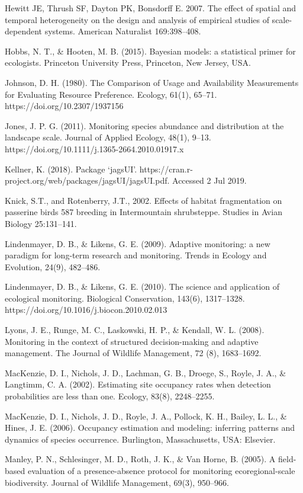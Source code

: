 \documentclass[
  letterpaper,
  DIV=11,
  numbers=noendperiod,
  oneside]{scrreprt}
\begin{document}
Hewitt JE, Thrush SF, Dayton PK, Bonsdorff E. 2007. The effect of
spatial and temporal heterogeneity on the design and analysis of
empirical studies of scale-dependent systems. American Naturalist
169:398--408.

Hobbs, N. T., \& Hooten, M. B. (2015). Bayesian models: a statistical
primer for ecologists. Princeton University Press, Princeton, New
Jersey, USA.

Johnson, D. H. (1980). The Comparison of Usage and Availability
Measurements for Evaluating Resource Preference. Ecology, 61(1), 65--71.
https://doi.org/10.2307/1937156

Jones, J. P. G. (2011). Monitoring species abundance and distribution at
the landscape scale. Journal of Applied Ecology, 48(1), 9--13.
https://doi.org/10.1111/j.1365-2664.2010.01917.x

Kellner, K. (2018). Package `jagsUI'.
https://cran.r-project.org/web/packages/jagsUI/jagsUI.pdf. Accessed 2
Jul 2019.

Knick, S.T., and Rotenberry, J.T., 2002. Effects of habitat
fragmentation on passerine birds 587 breeding in Intermountain
shrubsteppe. Studies in Avian Biology 25:131--141.

Lindenmayer, D. B., \& Likens, G. E. (2009). Adaptive monitoring: a new
paradigm for long-term research and monitoring. Trends in Ecology and
Evolution, 24(9), 482--486.

Lindenmayer, D. B., \& Likens, G. E. (2010). The science and application
of ecological monitoring. Biological Conservation, 143(6), 1317--1328.
https://doi.org/10.1016/j.biocon.2010.02.013

Lyons, J. E., Runge, M. C., Laskowski, H. P., \& Kendall, W. L. (2008).
Monitoring in the context of structured decision-making and adaptive
management. The Journal of Wildlife Management, 72 (8), 1683--1692.

MacKenzie, D. I., Nichols, J. D., Lachman, G. B., Droege, S., Royle, J.
A., \& Langtimm, C. A. (2002). Estimating site occupancy rates when
detection probabilities are less than one. Ecology, 83(8), 2248--2255.

MacKenzie, D. I., Nichols, J. D., Royle, J. A., Pollock, K. H., Bailey,
L. L., \& Hines, J. E. (2006). Occupancy estimation and modeling:
inferring patterns and dynamics of species occurrence. Burlington,
Massachusetts, USA: Elsevier.

Manley, P. N., Schlesinger, M. D., Roth, J. K., \& Van Horne, B. (2005).
A field-based evaluation of a presence-absence protocol for monitoring
ecoregional-scale biodiversity. Journal of Wildlife Management, 69(3),
950--966.
\end{document}
